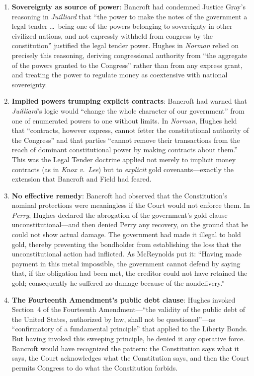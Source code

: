 \documentclass[12pt]{article}
\begin{document}
\begin{enumerate}

\item \textbf{Sovereignty as source of power}: Bancroft had condemned
Justice Gray's reasoning in \textit{Juilliard} that ``the power to make
the notes of the government a legal tender \ldots\ being one of the
powers belonging to sovereignty in other civilized nations, and not
expressly withheld from congress by the constitution'' justified the
legal tender power. Hughes in \textit{Norman} relied on precisely this
reasoning, deriving congressional authority from ``the aggregate of the
powers granted to the Congress'' rather than from any express grant, and
treating the power to regulate money as coextensive with national
sovereignty.

\item \textbf{Implied powers trumping explicit contracts}: Bancroft had
warned that \textit{Juilliard}'s logic would ``change the whole
character of our government'' from one of enumerated powers to one
without limits. In \textit{Norman}, Hughes held that ``contracts,
however express, cannot fetter the constitutional authority of the
Congress'' and that parties ``cannot remove their transactions from the
reach of dominant constitutional power by making contracts about them.''
This was the Legal Tender doctrine applied not merely to implicit money
contracts (as in \textit{Knox v.\ Lee}) but to \textit{explicit} gold
covenants---exactly the extension that Bancroft and Field had feared.

\item \textbf{No effective remedy}: Bancroft had observed that the
Constitution's nominal protections were meaningless if the Court would
not enforce them. In \textit{Perry}, Hughes declared the abrogation of
the government's gold clause unconstitutional---and then denied Perry
any recovery, on the ground that he could not show actual damage. The
government had made it illegal to hold gold, thereby preventing the
bondholder from establishing the loss that the unconstitutional action
had inflicted. As McReynolds put it: ``Having made payment in this
metal impossible, the government cannot defend by saying that, if the
obligation had been met, the creditor could not have retained the gold;
consequently he suffered no damage because of the nondelivery.''

\item \textbf{The Fourteenth Amendment's public debt clause}: Hughes
invoked Section~4 of the Fourteenth Amendment---``the validity of the
public debt of the United States, authorized by law, shall not be
questioned''---as ``confirmatory of a fundamental principle'' that
applied to the Liberty Bonds. But having invoked this sweeping
principle, he denied it any operative force. Bancroft would have
recognized the pattern: the Constitution says what it says, the Court
acknowledges what the Constitution says, and then the Court permits
Congress to do what the Constitution forbids.

\end{enumerate}
\end{document}
